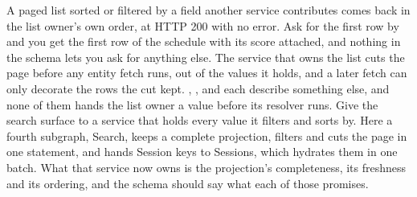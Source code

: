 \begin{problemsummary}
{A paged list sorted or filtered by a field another service contributes comes
back in the list owner's own order, at HTTP 200 with no error. Ask
 for the first row by  and you get the first
row of the schedule with its score attached, and nothing in the schema lets
you ask for anything else.}
{The service that owns the list cuts the page before any entity fetch runs,
out of the values it holds, and a later fetch can only decorate the rows the
cut kept. , ,  and
 each describe something else, and none of them hands the
list owner a value before its resolver runs.}
{Give the search surface to a service that holds every value it filters and
sorts by. Here a fourth subgraph, Search, keeps a complete projection, filters
and cuts the page in one statement, and hands Session keys to Sessions, which
hydrates them in one batch. What that service now owns is the projection's
completeness, its freshness and its ordering, and the schema should say what
each of those promises.}
\end{problemsummary}
